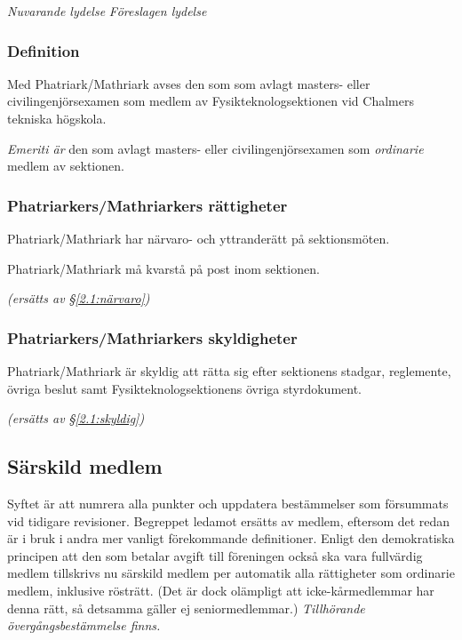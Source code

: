 \documentclass{article}
\newenvironment{lydelse}
    {\begin{paracol}{2}%
        \emph{Nuvarande lydelse}%
        \switchcolumn%
        \emph{Föreslagen lydelse}%
    \end{paracol}%
    \begin{enumerate}[label=\thesubsection.\arabic*]%
    \begin{paracol}{2}%
    }{\end{paracol}\end{enumerate}}
\newcommand{\itemb}{\item[\textbullet]}
\begin{document}
\begin{lydelse}%
  \subsubsection*{Definition}
    \itemb Med Phatriark/Mathriark avses den som som avlagt masters- eller civil\-ingenjörs\-examen som medlem av Fysik\-teknolog\-sektionen vid Ch\-al\-mers tekniska högskola.

  \switchcolumn
  \setcounter{enumi}{0}
    \item \emph{Emeriti är} den som avlagt masters- eller civilingenjörsexamen som \emph{ordinarie} medlem av sektionen.
    
  \switchcolumn*
    \subsubsection*{Phatriarkers/Mathriarkers rättigheter}%
    \itemb Phatriark/Mathriark har närvaro- och yttranderätt på sektionsmöten.

    \itemb Phatriark/Mathriark må kvarstå på post inom sektionen.
    
  \switchcolumn
    \emph{(ersätts av \S \ref{2.1:närvaro})}

  \switchcolumn*
    \subsubsection*{Phatriarkers/Mathriarkers skyldigheter}%
    \itemb Phatriark/Mathriark är skyldig att rätta sig efter sektionens stadgar, reglemente, övriga beslut samt Fysikteknologsektionens övriga styrdokument.
    
  \switchcolumn
    \emph{(ersätts av \S \ref{2.1:skyldig})}
\end{lydelse}

\subsection{Särskild medlem}
Syftet är att numrera alla punkter och uppdatera bestämmelser som försummats vid tidigare revisioner.
Begreppet ledamot ersätts av medlem, eftersom det redan är i bruk i andra mer vanligt förekommande definitioner.
Enligt den demokratiska principen att den som betalar avgift till föreningen också ska vara fullvärdig medlem tillskrivs nu särskild medlem per automatik alla rättigheter som ordinarie medlem, inklusive rösträtt.
(Det är dock olämpligt att icke-kårmedlemmar har denna rätt, så detsamma gäller ej seniormedlemmar.)
\emph{Tillhörande övergångsbestämmelse finns.}
\end{document}
